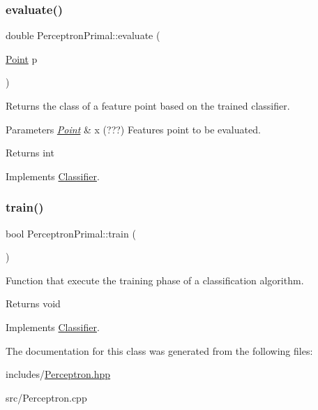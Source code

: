 \subsubsection{\texorpdfstring{evaluate()}{evaluate()}}
{\footnotesize\ttfamily double Perceptron\+Primal\+::evaluate (\begin{DoxyParamCaption}\item[{\hyperlink{class_point}{Point}}]{p }\end{DoxyParamCaption})\hspace{0.3cm}{\ttfamily [virtual]}}



Returns the class of a feature point based on the trained classifier. 


\begin{DoxyParams}{Parameters}
{\em \hyperlink{class_point}{Point}} & x (???) Features point to be evaluated. \\
\hline
\end{DoxyParams}
\begin{DoxyReturn}{Returns}
int 
\end{DoxyReturn}


Implements \hyperlink{class_classifier_ae8e9554823b85ddc2dcad2955da811d9}{Classifier}.

\mbox{\label{class_perceptron_primal_a17f817a72fc7d61d1686ea77f7f9e84d}} 
\subsubsection{\texorpdfstring{train()}{train()}}
{\footnotesize\ttfamily bool Perceptron\+Primal\+::train (\begin{DoxyParamCaption}{ }\end{DoxyParamCaption})\hspace{0.3cm}{\ttfamily [virtual]}}



Function that execute the training phase of a classification algorithm. 

\begin{DoxyReturn}{Returns}
void 
\end{DoxyReturn}


Implements \hyperlink{class_classifier_a2306a5de27555ab093593ac9642bc7d9}{Classifier}.



The documentation for this class was generated from the following files\+:\begin{DoxyCompactItemize}
\item 
includes/\hyperlink{_perceptron_8hpp}{Perceptron.\+hpp}\item 
src/Perceptron.\+cpp\end{DoxyCompactItemize}
